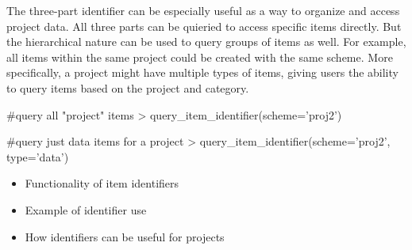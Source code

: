The three-part identifier can be especially useful as a way to organize and 
access project data. All three parts can be quieried to access specific items 
directly. But the hierarchical nature can be used to query groups of items as well. 
For example, all items within the same project could be created with the same 
scheme. More specifically, a project might have multiple types of items, giving
users the ability to query items based on the project and category.

\begin{example}
#query all "project" items
> query_item_identifier(scheme='proj2')


#query just data items for a project
> query_item_identifier(scheme='proj2', type='data')

\end{example}


\begin{itemize}
	\item{Functionality of item identifiers}
	\item{Example of identifier use}
	\item{How identifiers can be useful for projects}
\end{itemize}
